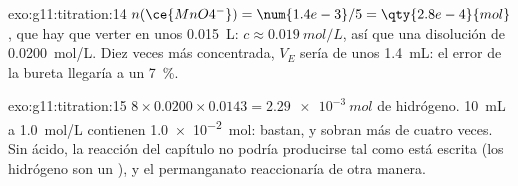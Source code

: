 \begin{solution}{exo:g11:titration:14}
$n(\ce{MnO4^-}) = \num{1.4e-3} / 5 = \qty{2.8e-4}{mol}$, que hay que
verter en unos \qty{0.015}{L}: $c \approx \qty{0.019}{mol/L}$, así que
una disolución de \qty{0.0200}{mol/L}. Diez veces más concentrada, $V_E$
sería de unos \qty{1.4}{mL}: el error de la bureta llegaría a un
\qty{7}{\percent}.
\end{solution}

\begin{solution}{exo:g11:titration:15}
$8 \times 0.0200 \times 0.0143 = \qty{2.29e-3}{mol}$ de  hidrógeno.
\qty{10}{mL} a \qty{1.0}{mol/L} contienen \qty{1.0e-2}{mol}: bastan, y
sobran más de cuatro veces. Sin ácido, la reacción del capítulo no
podría producirse tal como está escrita (los  hidrógeno son un
), y el permanganato reaccionaría de otra manera.
\end{solution}

